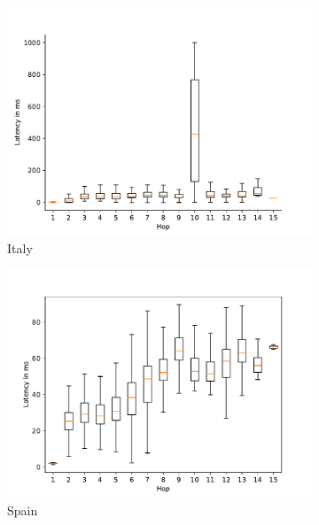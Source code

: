 \begin{figure}
\begin{subfigure}[b]{0.48\linewidth}
		\includegraphics[width=\linewidth]{chapters/4-results/traceroute/img/latency-per-hop-IT.pdf}
		\caption{Italy}
	\end{subfigure}
	\begin{subfigure}[b]{0.48\linewidth}
		\includegraphics[width=\linewidth]{chapters/4-results/traceroute/img/latency-per-hop-ES.pdf}
		\caption{Spain}
	\end{subfigure}
	\begin{subfigure}[b]{0.48\linewidth}

\end{subfigure}
\end{figure}
